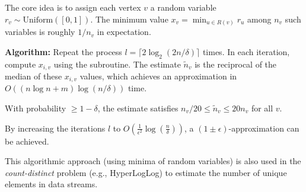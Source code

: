\begin{remark}
	The core idea is to assign each vertex $v$ a random variable $r_v \sim \text{Uniform}([0,1])$. The minimum value $x_v = \min_{u \in R(v)} r_u$ among $n_v$ such variables is roughly $1/n_v$ in expectation.
\end{remark}

\begin{theorem}
	\textbf{Algorithm:} Repeat the process $l = \lceil 2 \log_2(2n/\delta) \rceil$ times. In each iteration, compute $x_{i,v}$ using the subroutine. The estimate $\tilde{n}_v$ is the reciprocal of the median of these $x_{i,v}$ values, which achieves an approximation in $O((n \log n + m) \log(n/\delta))$ time.
\end{theorem}

\begin{theorem}
	With probability $\ge 1-\delta$, the estimate satisfies $n_v/20 \le \tilde{n}_v \le 20n_v$ for all $v$.
\end{theorem}

\begin{theorem}
	By increasing the iterations $l$ to $O(\frac{1}{\epsilon^2} \log(\frac{n}{\delta}))$, a $(1 \pm \epsilon)$-approximation can be achieved.
\end{theorem}

\begin{remark}
	This algorithmic approach (using minima of random variables) is also used in the \textit{count-distinct} problem (e.g., HyperLogLog) to estimate the number of unique elements in data streams.
\end{remark}
